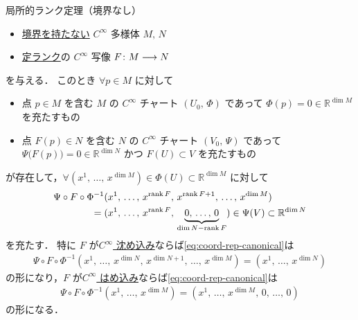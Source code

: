 \documentclass[TQFT_main]{subfiles}
\begin{document}
\begin{mytheo}[label=thm:rank]{局所的ランク定理（境界なし）}
    \begin{itemize}
        \item \underline{境界を持たない} $C^\infty$ 多様体 $M,\, N$ 
        \item \hyperref[def:rank-smooth]{定ランク}の $C^\infty$ 写像 $F \colon M \longrightarrow N$
    \end{itemize}
    を与える．
    このとき $\forall p \in M$ に対して
    \begin{itemize}
        \item 点 $p \in M$ を含む $M$ の $C^\infty$ チャート $(U_0,\, \Phi)$ であって $\Phi(p) = 0 \in \mathbb{R}^{\dim M}$ を充たすもの
        \item 点 $F(p) \in N$ を含む $N$ の $C^\infty$ チャート $(V_0,\, \Psi)$ であって $\Psi \bigl( F(p) \bigr) = 0 \in \mathbb{R}^{\dim N}$ かつ $F(U) \subset V$ を充たすもの
    \end{itemize}
    が存在して，$\forall (x^1,\, \dots,\, x^{\dim M}) \in \Phi(U) \subset \mathbb{R}^{\dim M}$ に対して
    \begin{align}
        \label{eq:coord-rep-canonical}
        \Psi \circ F \circ \Phi^{-1} &(x^1,\, \dots,\, x^{\rank F},\, x^{\rank F + 1},\, \dots,\,  x^{\dim M}) \\
        =\; &(x^1,\, \dots,\, x^{\rank F},\, \underbrace{0,\, \dots,\, 0}_{\dim N - \rank F}) \in \Psi(V) \subset \mathbb{R}^{\dim N}
    \end{align}
    を充たす．
    \tcblower
    特に $F$ が\hyperref[def:submersion-smooth]{$C^\infty$ 沈め込み}ならば\eqref{eq:coord-rep-canonical}は
    \begin{align}
        \label{eq:coord-rep-canonical-submersion}
        \Psi \circ F \circ \Phi^{-1} (x^1,\, \dots,\, x^{\dim N},\, x^{\dim N + 1},\, \dots,\,  x^{\dim M}) = (x^1,\, \dots,\, x^{\dim N})
    \end{align}
    の形になり，$F$ が\hyperref[def:submersion-smooth]{$C^\infty$ はめ込み}ならば\eqref{eq:coord-rep-canonical}は
    \begin{align}
        \label{eq:coord-rep-canonical-immersion}
        \Psi \circ F \circ \Phi^{-1} (x^1,\, \dots,\, x^{\dim M}) = (x^1,\, \dots,\, x^{\dim M},\, 0,\, \dots,\, 0)
    \end{align}
    の形になる．
\end{mytheo}    
\end{document}
